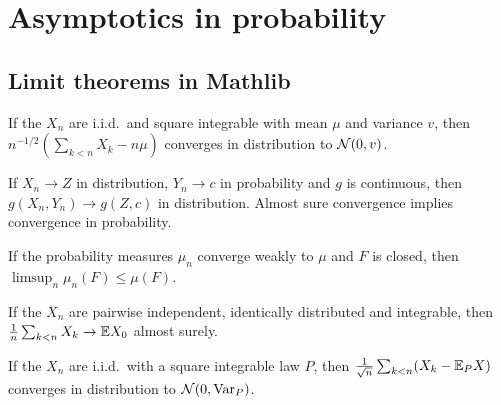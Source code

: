 \chapter{Asymptotics in probability}
\label{chap:pre_asymptotics}

\section{Limit theorems in Mathlib}

\begin{lemma}
  \label{lem:clt}
  \mathlibok
  If the $X_n$ are i.i.d.\ and square integrable with mean $\mu$ and variance $v$, then
  $n^{-1/2}(\sum_{k<n} X_k - n\mu)$ converges in distribution to $\mathcal{N}(0, v)$.
\end{lemma}

\begin{lemma}
  \label{lem:slutsky}
  \mathlibok
  If $X_n \to Z$ in distribution, $Y_n \to c$ in probability and $g$ is continuous, then
  $g(X_n, Y_n) \to g(Z, c)$ in distribution. Almost sure convergence implies convergence in
  probability.
\end{lemma}

\begin{lemma}
  \label{lem:portmanteau_closed}
  \mathlibok
  If the probability measures $\mu_n$ converge weakly to $\mu$ and $F$ is closed, then
  $\limsup_n \mu_n(F) \le \mu(F)$.
\end{lemma}

\begin{lemma}
  \label{lem:slln}
  \mathlibok
  If the $X_n$ are pairwise independent, identically distributed and integrable, then
  $\frac1n \sum_{k<n} X_k \to \mathbb{E} X_0$ almost surely.
\end{lemma}

\begin{lemma}
  \label{lem:clt_hasLaw}
  \leanok
  If the $X_n$ are i.i.d.\ with a square integrable law $P$, then
  $\frac{1}{\sqrt n}\sum_{k<n}(X_k - \mathbb{E}_P X)$ converges in distribution to $\mathcal{N}(0, \operatorname{Var}_P)$.
\end{lemma}


